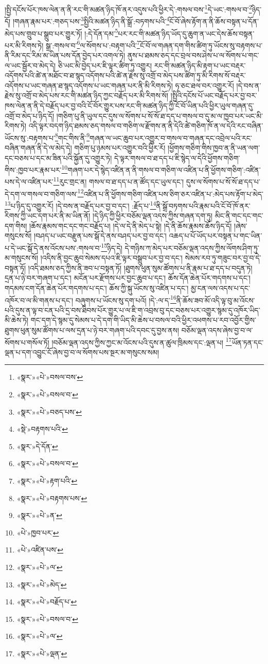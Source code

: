 །སྤྱི་དངོས་པོར་ཁས་ལེན་ན་ནི་རང་གི་མཚན་ཉིད་ཁོ་ནར་འདུས་པའི་ཕྱིར་དེ་:གསལ་བས་\footnote{«སྣར་»«པེ་»བསལ་བས་}དེ་ཡང་:གསལ་བ་\footnote{«སྣར་»«པེ་»བསལ་བ་}ཉིད་དོ། །གཞན་རྣམ་པར་:གཅད་པས་\footnote{«སྣར་»«པེ་»བཅད་པས་}སྤྱིའི་མཚན་ཉིད་ནི་སྒྲོ་:བཏགས་པའི་\footnote{«སྡེ་»བརྟགས་པའི་}ངོ་བོ་ཞེས་རྟོག་ན་ནི་ཆོས་བསྟན་པ་དོན་མེད་པས་གྲུབ་པ་སྒྲུབ་པར་གྱུར་ཏོ། །:དེ་དོན་དམ་\footnote{«སྣར་»དེ་དོན་}པར་རང་གི་མཚན་ཉིད་ཡོད་དུ་ཆུག་ན་ཡང་དེས་ཆོས་བསྟན་པར་མི་རིགས་ཏེ། སྒྲ་:གསལ་བ་\footnote{«སྣར་»«པེ་»བསལ་བ་}ལ་སོགས་པ་:བརྟག་པའི་\footnote{«སྣར་»«པེ་»རྟག་པའི་}ངོ་བོ་ལ་གཞན་དག་གིས་ཚིག་ཏུ་ཡོངས་སུ་བརྟགས་པ་ནི་རིམ་དང་རིམ་མ་ཡིན་པས་དོན་བྱེད་པར་འགལ་ཏེ། ནུས་པ་ཐམས་ཅད་དང་བྲལ་བས་ཤེས་པ་ལ་སོགས་པ་གང་ལ་ཡང་སྦྱོར་བ་མེད་དེ། ཅི་ཡང་མི་བྱེད་པར་ཇི་ལྟར་ཚིག་ཏུ་འགྱུར། རང་གི་མཚན་ཉིད་མི་རྟག་པ་ཡང་བརྡར་འདོགས་པའི་ཚེ་ན་མཐོང་བ་ཐ་སྙད་འདོགས་པའི་ཚེ་ན་རྗེས་སུ་འགྲོ་བ་མེད་པས་ཚིག་ཏུ་མི་རིགས་སོ་བརྡར་འདོགས་པ་ཡང་གཞན་ཐ་སྙད་འདོགས་པ་ཡང་གཞན་པར་ནི་མི་རིགས་ཏེ། ཧ་ཅང་ཐལ་བར་འགྱུར་རོ། །དེ་བས་ན་རྗེས་སུ་འགྲོ་བ་མེད་པས་རང་གི་མཚན་ཉིད་ཀྱང་བརྗོད་པར་མི་རིགས་སོ། །སྤྱིའི་དངོས་པོ་ཡང་བརྗོད་པར་བྱ་བར་ཁས་ལེན་ན་ནི་དེ་བརྗོད་པར་བྱ་བའི་ངོ་བོར་གྱུར་པས་རང་གི་མཚན་ཉིད་ཀྱི་ངོ་བོ་ཡིན་པའི་ཕྱིར་ཡུལ་གཞན་དུ་འགྲོ་བ་མེད་པ་ཉིད་དོ། །གཅིག་པུ་ནི་ཡུལ་དང་དུས་ལ་སོགས་པ་སོ་སོ་ཐ་དད་པ་གསལ་བ་དུ་མ་ལ་ཁྱབ་པར་ཡང་མི་རིགས་ཏེ། འདི་ལྟར་བདག་ཉིད་ཐམས་ཅད་གསལ་བ་གཅིག་ལ་རྫོགས་ན་ནི་དེའི་ཚེ་གཅིག་ཁོ་ན་ལ་དེའི་རང་བཞིན་ཡོངས་སུ་:བརྟགས་པ་\footnote{«སྣར་»«པེ་»བརྟགས་པས་}གང་གིས་ནི་\footnote{«སྣར་»«པེ་»ན་}གཞན་ལ་ཡང་ཆུབ་པར་འགྱུར་བ་གསལ་བ་གཞན་དང་འབྲེལ་པའི་རང་བཞིན་གཞན་ནི་དེ་ལ་མེད་དེ། གཅིག་པུ་ཉམས་པར་འགྱུར་བའི་ཕྱིར་རོ། །ཕྱོགས་གཅིག་གིས་ཁྱབ་ན་ནི་ཡན་ལག་དང་བཅས་པ་དང་མ་ཟིན་པའི་སྐྱོན་དུ་འགྱུར་ཏེ། དེ་ལྟར་གསལ་བ་ཐ་དད་པ་ཇི་སྙེད་ལ་དེའི་ཕྱོགས་གཅིག་གིས་:ཁྱབ་པར་རྣམ་པར་\footnote{«པེ་»ཁྱབ་པར་}གཞག་པར་དེ་སྙེད་འཛིན་ན་ནི་གསལ་བ་གཅིག་ལ་འཛིན་པ་ནི་ཕྱོགས་གཅིག་:འཛིན་པས་དེ་ལ་འཛིན་པར་\footnote{«པེ་»འཛིན་པས་}རུང་གྲང་ན། གསལ་བ་ཐ་དད་པ་ན་ཚོད་དང་ཡུལ་དང་། དུས་ལ་སོགས་པ་སོ་སོ་ཐ་དད་པ་དེ་དག་ལ་གསལ་བ་གཅིག་ལས་\footnote{«སྣར་»«པེ་»ལ་}འཛིན་པ་ནི་ཕྱོགས་གཅིག་འཛིན་པས་ཅིག་ཅར་འཛིན་པ་:མེད་པས་རྟོག་པ་མེད་\footnote{«སྣར་»«པེ་»མེད་}པ་ཉིད་དུ་འགྱུར་རོ། །དེ་བས་ན་བརྗོད་པར་བྱ་བ་དང་། :རྗོད་པ་\footnote{«སྣར་»«པེ་»བརྗོད་པ་}ནི་སྒྲོ་བཏགས་པའི་རྣམ་པའི་ངོ་བོ་ཁོ་ནར་རིགས་ཀྱི་ཡང་དག་པར་ནི་མ་ཡིན་ནོ། །དེ་ཉིད་ཀྱི་ཕྱིར་བཅོམ་ལྡན་འདས་ཀྱིས་གཞན་དག་ཏུ། མིང་ནི་གང་དང་གང་དག་གིས། །ཆོས་རྣམས་གང་དང་གང་བརྗོད་པ། །དེ་ལ་དེ་ནི་མེད་པ་སྟེ། །དེ་ནི་ཆོས་རྣམས་ཆོས་ཉིད་དོ། །ཞེས་གསུངས་སོ། །བཤད་པ་ཡང་བརྫུན་པས་སྒོ་དེ་ནས་བཤད་པར་བྱ་བ་དང་། འཆད་པ་པོ་ཡོད་པར་བསྟན་པ་གང་ཡིན་པ་དེ་ཡང་སྒོ་དེ་ནས་འོངས་པས་:གསལ་བ་\footnote{«སྣར་»«པེ་»བསལ་བ་}ཉིད་དེ། དེ་གཉིས་ཀ་མེད་པར་བཅོམ་ལྡན་འདས་ཀྱིས་ལོགས་ཤིག་ཏུ་མ་གསུངས་སོ། །འདིས་ནི་བྱང་ཆུབ་སེམས་དཔའ་ཇི་ལྟར་བསྒྲུབ་པར་བྱ་བ་དང་། སེམས་རབ་ཏུ་གཟུང་བར་བྱ་བ་དེ་བསྟན་ཏོ། །འདི་ཐམས་ཅད་ཀྱིས་ནི་ཟབ་པ་བསྟན་ཏོ། །ཐུགས་ཕུན་སུམ་ཚོགས་པ་ནི་རྣམ་པ་ཐ་དད་པ་བདུན་ཏེ། དྲན་པ་ཉེ་བར་གཞག་པ་དང་། མངོན་པར་རྫོགས་པར་བྱང་ཆུབ་པ་དང་། ཆོས་དོན་ཆེན་པོར་གདགས་པ་དང་། གདམས་ངག་དོན་ཆེན་པོར་གདགས་པ་དང་། ཆོས་ཀྱི་སྐུ་ཡོངས་སུ་འཛིན་པ་དང་། མྱ་ངན་ལས་འདས་པ་དང་འཁོར་བ་ལ་མི་གནས་པ་དང་། བཞུགས་པ་ཡོངས་སུ་དག་པའོ། །དེ་:ལ་ད་\footnote{«སྣར་»«པེ་»ལ་}ནི་ཆོས་ཟབ་མོ་འདི་ལྟ་བུ་མ་འོངས་པའི་དུས་ན་ལྟ་བ་ངན་པའི་དྲ་བས་ཐིབས་པོར་གྱུར་པ་ལ་ཇི་ག་འབྲས་བུ་དང་བཅས་པར་འགྱུར་སྙམ་དུ་འཁོར་ཡིད་མི་ཆེས་ཏེ། གང་དག་དེ་སྙམ་དུ་སེམས་པ་དེ་དག་གི་ཡིད་མི་ཆེས་པ་བསལ་བའི་ཕྱིར་འཕགས་པ་རབ་འབྱོར་གྱིས་ཐུགས་ཕུན་སུམ་ཚོགས་པ་ལས་དྲན་པ་ཉེ་བར་གཞག་པའི་དབང་དུ་བྱས་ནས། བཅོམ་ལྡན་འདས་ཞེས་བྱ་བ་ལ་སོགས་པ་གསོལ་ཏོ། །བཅོམ་ལྡན་འདས་ཀྱིས་ཀྱང་མ་འོངས་པའི་དུས་ན་ཚུལ་ཁྲིམས་དང་:ལྡན་པ། \footnote{«སྣར་»«པེ་»ལྡན་}ཡོན་ཏན་དང་ལྡན་པ་དག་འབྱུང་ངོ་ཞེས་བྱ་བ་ལ་སོགས་པས་སྔར་མ་གསུངས་སམ། 